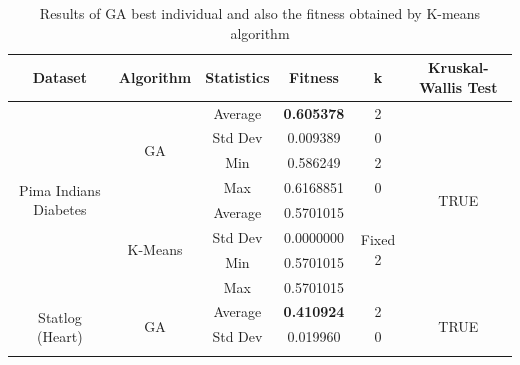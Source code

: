\documentclass[journal]{IEEEtran}
\begin{document}
	\begin{table}[]
		\centering
		\caption{Results of GA best individual and also the fitness obtained by K-means algorithm}
		\label{results-ga-and-kmeans}
		\begin{tabular}{|c|c|c|c|c|c|}
			\hline
			\textbf{Dataset}           & \textbf{Algorithm} & \textbf{Statistics} & \textbf{Fitness} & \textbf{k}    & \textbf{Kruskal-Wallis Test}   \\ \hline
			\multirow{8}{*}{Pima Indians Diabetes} & \multirow{4}{*}{GA}           & Average                        & \textbf{0.605378}                    & 2                        & \multirow{8}{*}{TRUE} \\ \cline{3-5}
			&                               & Std Dev                        & 0.009389                    & 0                        &                       \\ \cline{3-5}
			&                               & Min                            & 0.586249                    & 2                        &                       \\ \cline{3-5}
			&                               & Max                            & 0.6168851                   & 0                        &                       \\ \cline{2-5}
			& \multirow{4}{*}{K-Means}      & Average                        & 0.5701015                   & \multirow{4}{*}{Fixed 2} &                       \\ \cline{3-4}
			&                               & Std Dev                        & 0.0000000                   &                          &                       \\ \cline{3-4}
			&                               & Min                            & 0.5701015                   &                          &                       \\ \cline{3-4}
			&                               & Max                            & 0.5701015                   &                          &                       \\ \hline
			\multirow{8}{*}{Statlog (Heart)}       & \multirow{4}{*}{GA}           & Average                        & \textbf{0.410924}                    & 2                        & \multirow{8}{*}{TRUE} \\ \cline{3-5}
			&                               & Std Dev                        & 0.019960                    & 0                        &                       \\ \cline{3-5}

\end{tabular}
\end{table}
\end{document}
